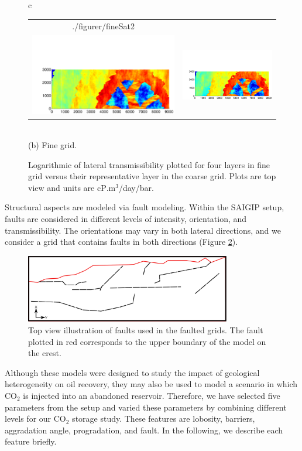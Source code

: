 \begin{figure}
\begin{tabular}{c}
\begin{minipage}{1\textwidth}
\begin{tabular}{cc}
{./figurer/fineSat2}\\
\includegraphics[trim=0.5cm 0cm 0cm 2.5cm, clip=true,width=0.5 \linewidth]
{./figurer/fineSat3}&
\includegraphics[trim=0.5cm 0cm 0cm 2.5cm, clip=true,width=0.5 \linewidth]
{./figurer/fineSat4}
\end{tabular}
\end{minipage}\\(b) Fine grid.
\end{tabular}
\caption{Logarithmic of lateral transmissibility plotted for four layers in fine grid versus their representative layer in the coarse grid. Plots are top view and units are cP$.$m$^3$/day/bar.}
\label{fig:upsat}
\end{figure}

Structural aspects are modeled via fault modeling. Within the SAIGIP setup, faults are considered in different levels of intensity, orientation, and transmissibility. The orientations may vary in both lateral directions, and we consider a grid that contains faults in both directions (Figure \ref{fig:fltGrd}).

\begin{figure}
\centering
\includegraphics[width=0.8\textwidth]{./figurer/faultedGrid}
\caption{Top view illustration of faults used in the faulted grids. The fault plotted in red corresponds to the upper boundary of the model on the crest.}
\label{fig:fltGrd}
\end{figure}
Although these models were designed to study the impact of geological
heterogeneity on oil recovery, they may also be used to model a scenario in
which $\mbox{CO}_2$ is injected into an abandoned reservoir. Therefore, we have
selected five parameters from the setup and varied these parameters by combining
different levels for our $\mbox{CO}_2$ storage study. These features are
lobosity, barriers, aggradation angle, progradation, and fault. In the
following, we describe each feature briefly.


